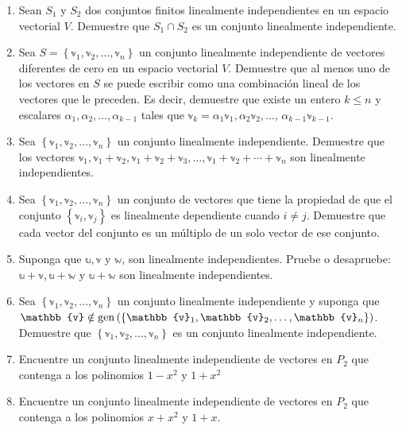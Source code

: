 \begin{enumerate}[start=90]
    \item Sean $S_{1}$ y $S_{2}$ dos conjuntos finitos linealmente independientes en un espacio vectorial $V$. Demuestre que $S_{1} \cap S_{2}$ es un conjunto linealmente independiente.
    \item Sea $S=\left\{\mathbb{v}_{1}, \mathbb{v}_{2}, \dots, \mathbb{v}_{n}\right\}$ un conjunto linealmente independiente de vectores diferentes de cero en un espacio vectorial $V$. Demuestre que al menos uno de los vectores en $S$ se puede escribir como una combinación lineal de los vectores que le preceden. Es decir, demuestre que existe un entero $k \leq n$ y escalares $\alpha_{1}, \alpha_{2}, \dots, \alpha_{k-1}$ tales que $\mathbb{v}_{k}=\alpha_{1} \mathbb{v}_{1}, \alpha_{2} \mathbb{v}_{2}, \dots$, $\alpha_{k-1} \mathbb{v}_{k-1}$.\newpage
    \item Sea $\left\{\mathbb{v}_{1}, \mathbb{v}_{2}, \dots, \mathbb{v}_{n}\right\}$ un conjunto linealmente independiente. Demuestre que los vectores $\mathbb{v}_{1}, \mathbb{v}_{1}+\mathbb{v}_{2}, \mathbb{v}_{1}+\mathbb{v}_{2}+\mathbb{v}_{3}, \dots, \mathbb{v}_{1}+\mathbb{v}_{2}+\cdots+\mathbb{v}_{n}$ son linealmente independientes.
    \item Sea $\left\{\mathbb{v}_{1}, \mathbb{v}_{2}, \dots, \mathbb{v}_{n}\right\}$ un conjunto de vectores que tiene la propiedad de que el conjunto $\left\{\mathbb{v}_{i}, \mathbb{v}_{j}\right\}$ es linealmente dependiente cuando $i \neq j$. Demuestre que cada vector del conjunto es un múltiplo de un solo vector de ese conjunto.
    \item Suponga que $\mathbb{u}, \mathbb{v}$ y $\mathbb{w}$, son linealmente independientes. Pruebe o desapruebe: $\mathbb{u}+\mathbb{v}, \mathbb{u}+\mathbb{w}$ y $\mathbb{u}+\mathbb{w}$ son linealmente independientes.
    \item Sea $\left\{\mathbb{v}_{1}, \mathbb{v}_{2}, \dots, \mathbb{v}_{n}\right\}$ un conjunto linealmente independiente y suponga que $\mathbb{v} \notin \Gen \left( \left\{\mathbb{v}_{1}, \mathbb{v}_{2}, \dots, \mathbb{v}_{n}\right\} \right)$. Demuestre que $\left\{\mathbb{v}_{1}, \mathbb{v}_{2}, \dots, \mathbb{v}_{n}\right\}$ es un conjunto linealmente independiente.
    \item Encuentre un conjunto linealmente independiente de vectores en $P_{2}$ que contenga a los polinomios $1-x^{2}$ y $1+x^{2}$
    \item Encuentre un conjunto linealmente independiente de vectores en $P_{2}$ que contenga a los polinomios $x+x^{2}$ y $1+x$.
\end{enumerate}
